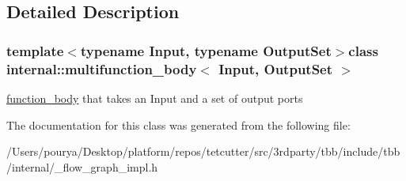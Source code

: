 \subsection{Detailed Description}
\subsubsection*{template$<$typename Input, typename Output\+Set$>$class internal\+::multifunction\+\_\+body$<$ Input, Output\+Set $>$}

\hyperlink{classinternal_1_1function__body}{function\+\_\+body} that takes an Input and a set of output ports 

The documentation for this class was generated from the following file\+:\begin{DoxyCompactItemize}
\item 
/\+Users/pourya/\+Desktop/platform/repos/tetcutter/src/3rdparty/tbb/include/tbb/internal/\+\_\+flow\+\_\+graph\+\_\+impl.\+h\end{DoxyCompactItemize}
